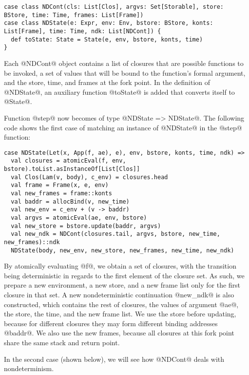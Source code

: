 \documentclass[acmsmall]{acmart}\settopmatter{}
\begin{document}
\begin{lstlisting}
case class NDCont(cls: List[Clos], argvs: Set[Storable], store: BStore, time: Time, frames: List[Frame])
case class NDState(e: Expr, env: Env, bstore: BStore, konts: List[Frame], time: Time, ndk: List[NDCont]) {
  def toState: State = State(e, env, bstore, konts, time)
}
\end{lstlisting}

Each @NDCont@ object contains a list of closures that are possible functions to be invoked,
a set of values that will be bound to the function's formal argument,
and the store, time, and frames at the fork point.
In the definition of @NDState@, an auxiliary function @toState@ is added that
converts itself to @State@.

Function @step@ now becomes of type @NDState => NDState@.
The following code shows the first case of matching an instance of @NDState@ in
the @step@ function:

\begin{lstlisting}
case NDState(Let(x, App(f, ae), e), env, bstore, konts, time, ndk) =>
  val closures = atomicEval(f, env, bstore).toList.asInstanceOf[List[Clos]]
  val Clos(Lam(v, body), c_env) = closures.head
  val frame = Frame(x, e, env)
  val new_frames = frame::konts
  val baddr = allocBind(v, new_time)
  val new_env = c_env + (v -> baddr)
  val argvs = atomicEval(ae, env, bstore)
  val new_store = bstore.update(baddr, argvs)
  val new_ndk = NDCont(closures.tail, argvs, bstore, new_time, new_frames)::ndk
  NDState(body, new_env, new_store, new_frames, new_time, new_ndk)
\end{lstlisting}

By atomically evaluating @f@, we obtain a set of closures, with the transition being 
deterministic in regards to the first element of the closure set.
As such, we prepare a new environment, a new store, and a new frame list only for the
first closure in that set.
A new nondeterministic continuation @new_ndk@ is also constructed,
which contains the rest of closures, the values of argument @ae@, the store,
the time, and the new frame list.
We use the store before updating, because for different closures they may form
different binding addresses @baddr@.
We also use the new frames, because all closures at this fork point share
the same stack and return point.

In the second case (shown below), we will see how @NDCont@ deals with
nondeterminism.
\end{document}
